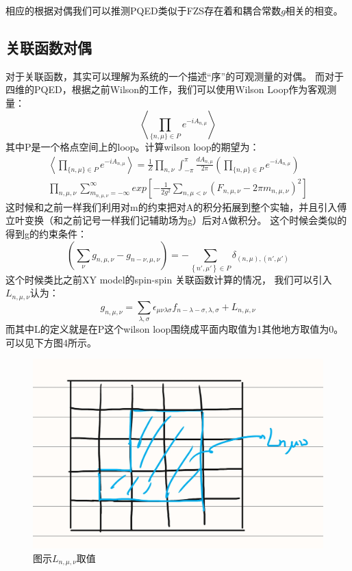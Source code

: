 \documentclass{article}
\begin{document}
相应的根据对偶我们可以推测PQED类似于FZS存在着和耦合常数$g$相关的相变。

\subsection{关联函数对偶}
对于关联函数，其实可以理解为系统的一个描述“序”的可观测量的对偶。
而对于四维的PQED，根据之前Wilson的工作，我们可以使用Wilson Loop作为客观测量：
\begin{equation}
    \left\langle \prod_{\{ n,\mu \} \in P} e^{-i A_{n,\mu}} \right\rangle 
\end{equation}
其中P是一个格点空间上的loop。计算wilson loop的期望为：
\begin{equation}
    \begin{split}
        \left\langle \prod_{\{ n,\mu \} \in P} e^{-i A_{n,\mu}} \right\rangle  = \frac{1}{Z} \prod_{n,\nu}\int_{- \pi}^{\pi}\frac{d A_{n,\mu}}{2 \pi} \left(\prod_{\{ n,\mu \} \in P} e^{-i A_{n,\mu}} \right) \\
        \prod_{n,\mu,\nu} \sum_{m_{n,\mu,\nu} = -\infty}^{\infty} exp\left[ - \frac{1}{2g^2}\sum_{n,\mu<\nu}\left(F_{n,\mu,\nu} - 2 \pi m_{n,\mu,\nu}\right)^2 \right] 
    \end{split}
\end{equation}
这时候和之前一样我们利用对m的约束把对A的积分拓展到整个实轴，并且引入傅立叶变换（和之前记号一样我们记辅助场为g）后对A做积分。
这个时候会类似的得到g的约束条件：
\begin{equation}
    \left( \sum_{\nu} g_{n,\mu,\nu} - g_{n- \nu,\mu,\nu} \right)  = - \sum_{\left\{n',\mu'\right\} \in P }\delta_{(n,\mu),(n',\mu')}
\end{equation}
这个时候类比之前XY model的spin-spin 关联函数计算的情况，
我们可以引入$L_{n,\mu,\nu}$认为：
\begin{equation}
    g_{n,\mu,\nu} = \sum_{\lambda,\sigma}\epsilon_{\mu\nu\lambda\sigma} f_{n-\lambda-\sigma,\lambda,\sigma} + L_{n,\mu,\nu}
\end{equation}
而其中L的定义就是在P这个wilson loop围绕成平面内取值为1其他地方取值为0。可以见下方图4所示。
\begin{figure}[h]
    \centering
    \includegraphics[scale=0.2]{4.jpg}
    \caption[short]{图示$L_{n,\mu,\nu}$取值}
    \label{figure}
\end{figure}
\end{document}
